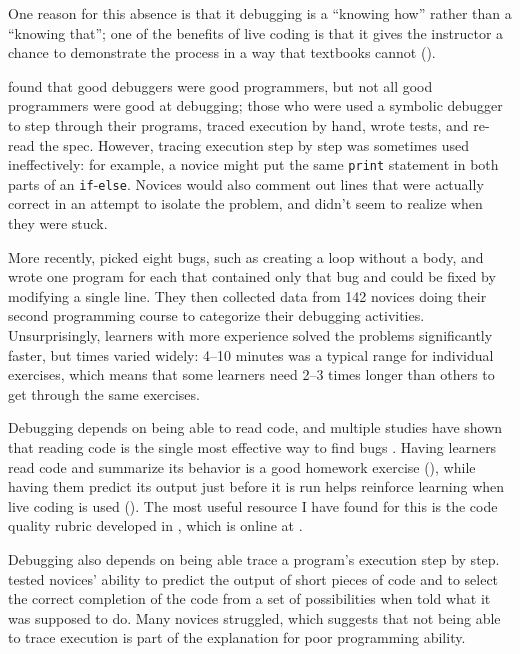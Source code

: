 One reason for this absence is that it debugging is a ``knowing how''
rather than a ``knowing that''; one of the benefits of live coding is
that it gives the instructor a chance to demonstrate the process in a
way that textbooks cannot ().

\cite{Fitz2008,Murp2008} found that good debuggers were good
programmers, but not all good programmers were good at debugging;
those who were used a symbolic debugger to step through their
programs, traced execution by hand, wrote tests, and re-read the
spec. However, tracing execution step by step was sometimes used
ineffectively: for example, a novice might put the same \texttt{print}
statement in both parts of an \texttt{if}-\texttt{else}.  Novices
would also comment out lines that were actually correct in an attempt
to isolate the problem, and didn't seem to realize when they were
stuck.

More recently, \cite{Alqa2017} picked eight bugs, such as creating a
loop without a body, and wrote one program for each that contained
only that bug and could be fixed by modifying a single line.  They
then collected data from 142 novices doing their second programming
course to categorize their debugging activities.  Unsurprisingly,
learners with more experience solved the problems significantly
faster, but times varied widely: 4--10 minutes was a typical range for
individual exercises, which means that some learners need 2--3 times
longer than others to get through the same exercises.

Debugging depends on being able to read code, and multiple studies
have shown that reading code is the single most effective way to find
bugs \cite{Basi1987,Keme2009,Bacc2013}.  Having learners read code and
summarize its behavior is a good homework exercise
(), while having them predict its
output just before it is run helps reinforce learning when live coding
is used ().  The most useful resource I
have found for this is the code quality rubric developed in
\cite{Steg2014,Steg2016a}, which is online at \cite{Steg2016b}.

Debugging also depends on being able trace a program's execution step
by step.  \cite{List2004} tested novices' ability to predict the
output of short pieces of code and to select the correct completion of
the code from a set of possibilities when told what it was supposed to
do.  Many novices struggled, which suggests that not being able to
trace execution is part of the explanation for poor programming
ability.

